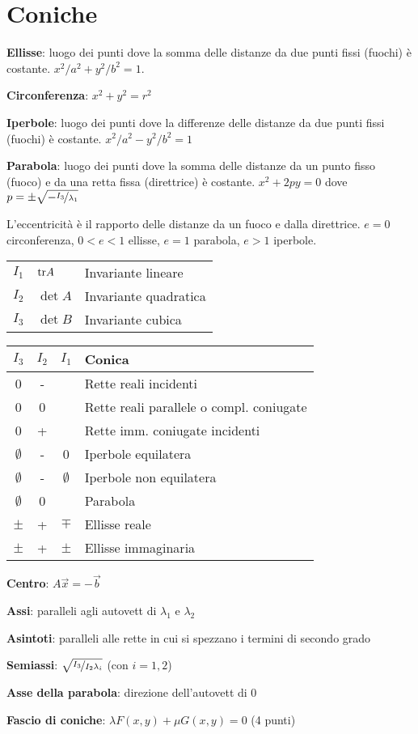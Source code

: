 \section{Coniche}

\textbf{Ellisse}: luogo dei punti dove la somma delle distanze da due punti fissi (fuochi) è costante. $x^2/a^2 + y^2/b^2 = 1$.

\textbf{Circonferenza}: $x^2+y^2=r^2$

\textbf{Iperbole}: luogo dei punti dove la differenze delle distanze da due punti fissi (fuochi) è costante. $x^2/a^2 - y^2/b^2 = 1$

\textbf{Parabola}: luogo dei punti dove la somma delle distanze da un punto fisso (fuoco) e da una retta fissa (direttrice) è costante. $x^2+2py=0$ dove $p=\pm \sqrt{-\nicefrac{I_3}{\lambda_1}}$

L'eccentricità è il rapporto delle distanze da un fuoco e dalla direttrice. $e = 0$ circonferenza, $0 < e < 1$ ellisse, $e = 1$ parabola, $e > 1$ iperbole. 

\begin{tabular}{lll}
	$I_1$ & $\mathrm{tr} A$ & Invariante lineare \\
	$I_2$ & $\det A$ & Invariante quadratica \\
	$I_3$ & $\det B$ & Invariante cubica
\end{tabular}

\begin{tabular}{c|c|c|l}
	\boldmath$I_3$ & \boldmath$I_2$ & \boldmath$I_1$ & \textbf{Conica} \\
	\hline
	0     & -     &       & Rette reali incidenti \\
	0     & 0     &       & Rette reali parallele o compl. coniugate \\
	0     & +     &       & Rette imm. coniugate incidenti \\
	\hline
	$\emptyset$ & -     & 0     & Iperbole equilatera \\
	$\emptyset$ & -     & $\emptyset$ & Iperbole non equilatera \\
	$\emptyset$ & 0     &       & Parabola \\
	$\pm$ & +     & $\mp$ & Ellisse reale \\
	$\pm$ & +     & $\pm$ & Ellisse immaginaria \\
	\hline
\end{tabular}

\textbf{Centro}: $A\vec{x} = -\vec{b}$

\textbf{Assi}: paralleli agli autovett di $\lambda_1$ e $\lambda_2$

\textbf{Asintoti}: paralleli alle rette in cui si spezzano i termini di secondo grado

\textbf{Semiassi}: $\sqrt{\nicefrac{I_3}{I_2\lambda_i}}$ (con $i=1,2$)

\textbf{Asse della parabola}: direzione dell'autovett di 0

\textbf{Fascio di coniche}: $\lambda F(x,y) + \mu G(x,y) = 0$ (4 punti)
